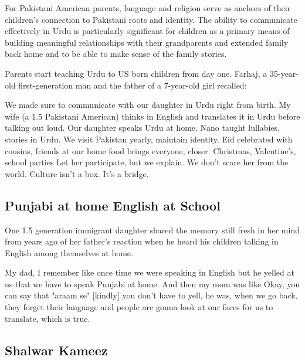 For Pakistani American parents, language and religion serve as anchors of their children’s connection to Pakistani roots and identity. The ability to communicate effectively in Urdu is particularly significant for children as a primary means of building meaningful relationships with their grandparents and extended family back home and to be able to make sense of the family stories.

Parents start teaching Urdu to US born children from day one. Farhaj, a 35-year-old first-generation man and the father of a 7-year-old girl recalled:

\begin{FoundPoem}
We made sure to communicate with our daughter in Urdu 
right from birth. My wife (a 1.5 Pakistani American) thinks in English and
translates it in Urdu before talking out loud.
Our daughter speaks Urdu at home.
Nano taught lullabies, stories in Urdu.
We visit Pakistan yearly,		 maintain identity.
Eid celebrated with cousins, friends at our home 
food brings everyone, closer.
Christmas, Valentine’s, school parties
Let her participate, but we explain.
We don’t scare her from the world.
Culture isn’t a box. It’s a bridge.

\end{FoundPoem}

\subsection{Punjabi at home English at School}

One 1.5 generation immigrant daughter shared the memory still fresh in her mind from years ago of her father’s reaction when he heard his children talking in English among themselves at home.

\begin{FoundPoem}
       My dad,
 I remember like once time we were speaking in English but 
he yelled at us that we have to speak Punjabi at home. 
And then my mom was like Okay, you can say that "araam se" [kindly] 
 you don't have to yell, he was, when we go back, they forget their language
 and people are gonna look at our faces for us to translate, which is true. 
\end{FoundPoem}

\subsection{Shalwar Kameez}

